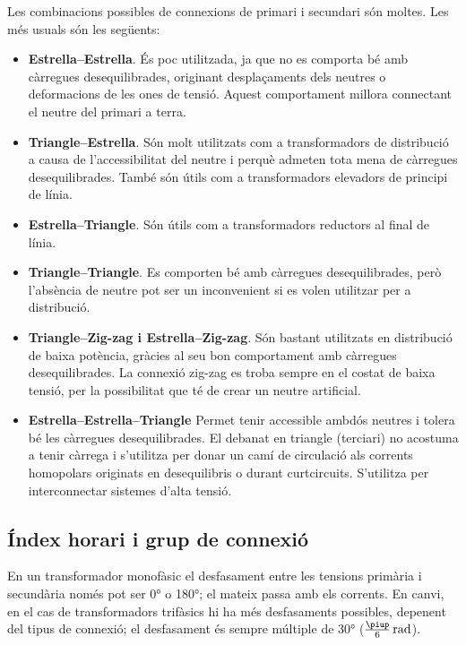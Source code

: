 Les combinacions possibles de connexions de primari i secundari són moltes. Les més usuals són les següents:
\begin{itemize}
   \item \textbf{Estrella--Estrella}. És poc utilitzada, ja que no es comporta bé amb càrregues desequilibrades, originant desplaçaments dels neutres o deformacions de les ones de tensió. Aquest comportament millora connectant el neutre del primari a terra.
   \item \textbf{Triangle--Estrella}. Són molt utilitzats com a transformadors de distribució a causa de l'accessibilitat del neutre i perquè admeten tota mena de càrregues desequilibrades. També són útils com a transformadors elevadors de principi de línia.
   \item \textbf{Estrella--Triangle}. Són útils com a transformadors reductors al final de línia.
   \item \textbf{Triangle--Triangle}. Es comporten bé amb càrregues desequilibrades, però l'absència de neutre pot ser un inconvenient si es volen utilitzar per a distribució.
   \item \textbf{Triangle--Zig-zag i Estrella--Zig-zag}. Són bastant utilitzats en distribució de baixa potència, gràcies al seu bon comportament amb càrregues desequilibrades. La connexió zig-zag es troba sempre en el costat de baixa tensió, per la possibilitat que té de crear un neutre artificial.
   \item \textbf{Estrella--Estrella--Triangle} Permet tenir accessible ambdós  neutres i tolera  bé les càrregues  desequilibrades. El debanat en triangle (terciari) no acostuma a tenir càrrega i s'utilitza per donar un camí de circulació als corrents homopolars originats en desequilibris o durant curtcircuits. S'utilitza per interconnectar sistemes d'alta tensió.
\end{itemize}


\subsection{Índex horari i grup de connexió}\label{sec:connex-index-horari}

En un transformador monofàsic el desfasament entre les tensions primària i secundària només pot ser \ang{0} o \ang{180}; el mateix passa amb els corrents. En canvi, en el cas de transformadors trifàsics hi ha més desfasaments possibles, depenent del tipus de connexió; el desfasament és sempre múltiple de \ang{30} ($\frac{\piup}{6}\si{\,rad}$).

